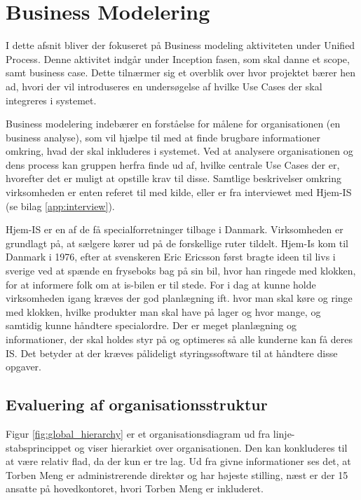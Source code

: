 \chapter{Business Modelering}\label{ch:businessanalysis}

I dette afsnit bliver der fokuseret på Business modeling aktiviteten under Unified Process\cite{UnifiedProcess}. Denne aktivitet indgår under Inception fasen, som skal danne et scope, samt business case. Dette tilnærmer sig et overblik over hvor projektet bærer hen ad, hvori der vil introduseres en undersøgelse af hvilke Use Cases der skal integreres i systemet. 

Business modelering indebærer en forståelse for målene for organisationen (en business analyse), som vil hjælpe til med at finde brugbare informationer omkring, hvad der skal inkluderes i systemet\cite{UP}. Ved at analysere organisationen og dens process kan gruppen herfra finde ud af, hvilke centrale Use Cases der er, hvorefter det er muligt at opstille krav til disse. Samtlige beskrivelser omkring virksomheden er enten referet til med kilde, eller er fra interviewet med Hjem-IS (se bilag \ref{app:interview}).

Hjem-IS er en af de få specialforretninger tilbage i Danmark. Virksomheden er grundlagt på, at sælgere kører ud på de forskellige ruter tildelt. Hjem-Is kom til Danmark i 1976\cite{Hjemisabout}, efter at svenskeren Eric Ericsson først bragte ideen til livs i sverige ved at spænde en fryseboks bag på sin bil, hvor han ringede med klokken, for at informere folk om at is-bilen er til stede. For i dag at kunne holde virksomheden igang kræves der god planlægning ift. hvor man skal køre og ringe med klokken, hvilke produkter man skal have på lager og hvor mange, og samtidig kunne håndtere specialordre. Der er meget planlægning og informationer, der skal holdes styr på og optimeres så alle kunderne kan få deres IS. Det betyder at der kræves pålideligt styringssoftware til at håndtere disse opgaver. 

\section{Evaluering af organisationsstruktur}
Figur \ref{fig:global_hierarchy} er et organisationsdiagram ud fra linje-stabsprincippet\cite{Organisation} og viser hierarkiet over organisationen. Den kan konkluderes til at være relativ flad, da der kun er tre lag. Ud fra givne informationer ses det, at Torben Meng er administrerende direktør og har højeste stilling, næst er der 15 ansatte på hovedkontoret, hvori Torben Meng er inkluderet.

